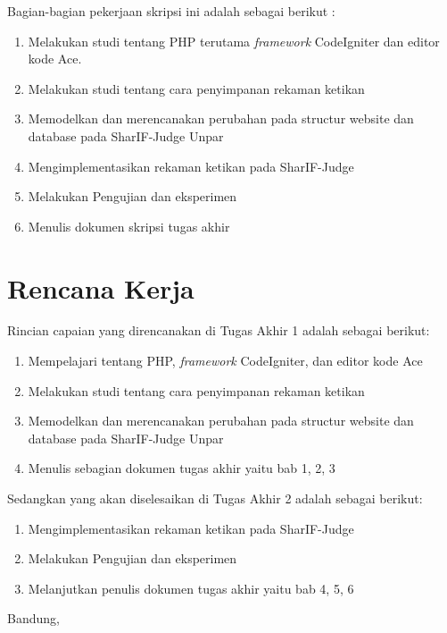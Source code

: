 \documentclass[a4paper,twoside]{article}
\begin{document}
Bagian-bagian pekerjaan skripsi ini adalah sebagai berikut :
	\begin{enumerate}

        \item Melakukan studi tentang PHP terutama \textit{framework} CodeIgniter dan editor kode Ace.
        \item Melakukan studi tentang cara penyimpanan rekaman ketikan
        \item Memodelkan dan merencanakan perubahan pada structur website dan database pada SharIF-Judge Unpar
        \item Mengimplementasikan rekaman ketikan pada SharIF-Judge
        \item Melakukan Pengujian dan eksperimen
        \item Menulis dokumen skripsi tugas akhir
 
	\end{enumerate}

\section{Rencana Kerja}
Rincian capaian yang direncanakan di Tugas Akhir 1 adalah sebagai berikut:
\begin{enumerate}
\item Mempelajari tentang PHP, \textit{framework} CodeIgniter, dan editor kode Ace
\item Melakukan studi tentang cara penyimpanan rekaman ketikan
\item Memodelkan dan merencanakan perubahan pada structur website dan database pada SharIF-Judge Unpar
\item Menulis sebagian dokumen tugas akhir yaitu bab 1, 2, 3
\end{enumerate}

Sedangkan yang akan diselesaikan di Tugas Akhir 2 adalah sebagai berikut:
\begin{enumerate}
\item Mengimplementasikan rekaman ketikan pada SharIF-Judge
\item Melakukan Pengujian dan eksperimen
\item Melanjutkan penulis dokumen tugas akhir yaitu bab 4, 5, 6 
\end{enumerate}

\vspace{1cm}
\centering Bandung, \tanggal\\
\vspace{2cm} \nama \\ 
\vspace{1cm}
\end{document}

